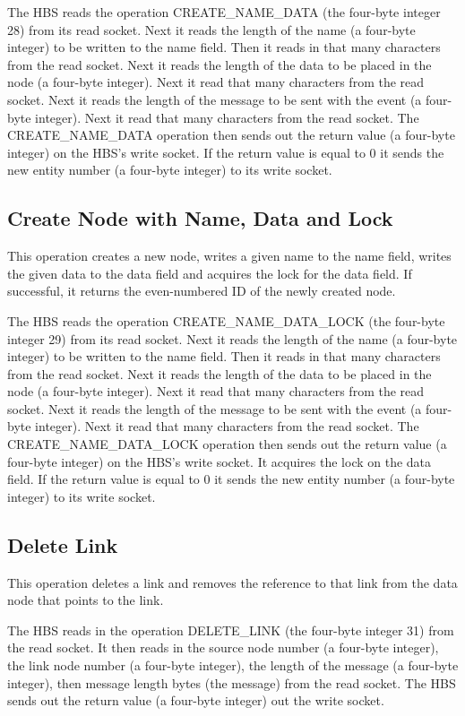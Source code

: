 The HBS reads the operation CREATE\_NAME\_DATA (the four-byte integer 28)
from its read socket. Next it reads the length of the name (a four-byte
integer) to be written to the name field.  Then it reads in that many
characters from the read socket.  Next it reads the length of the data to
be placed in the node (a four-byte integer).  Next it read that many
characters from the read socket.  Next it reads the length of the message
to be sent with the event (a four-byte integer).  Next it read that many
characters from the read socket.  The CREATE\_NAME\_DATA operation then
sends out the return value (a four-byte integer) on the HBS's write socket.
If the return value is equal to 0 it sends the new entity number (a
four-byte integer) to its write socket.

\subsection{Create Node with Name, Data and Lock}

This operation creates a new node, writes a given name to the name
field, writes the given data to the data field and acquires the lock for
the data field.  If successful, it returns the even-numbered ID of the newly
created node.  

The HBS reads the operation CREATE\_NAME\_DATA\_LOCK (the four-byte integer
29) from its read socket. Next it reads the length of the name (a four-byte
integer) to be written to the name field.  Then it reads in that many
characters from the read socket.  Next it reads the length of the data to
be placed in the node (a four-byte integer).  Next it read that many
characters from the read socket.  Next it reads the length of the message
to be sent with the event (a four-byte integer).  Next it read that many
characters from the read socket.  The CREATE\_NAME\_DATA\_LOCK operation
then sends out the return value (a four-byte integer) on the HBS's write
socket.  It acquires the lock on the data field.  If the return value is
equal to 0 it sends the new entity number (a four-byte integer) to its
write socket.

\subsection{Delete Link}

This operation deletes a link and removes the reference to that link from
the data node that points to the link.

The HBS reads in the operation DELETE\_LINK (the four-byte integer 31) from
the read socket.  It then reads in the source node number (a four-byte
integer), the link node number (a four-byte integer), the length of the
message (a four-byte integer), then message length bytes (the message) from
the read socket.  The HBS sends out the return value (a four-byte integer)
out the write socket.


